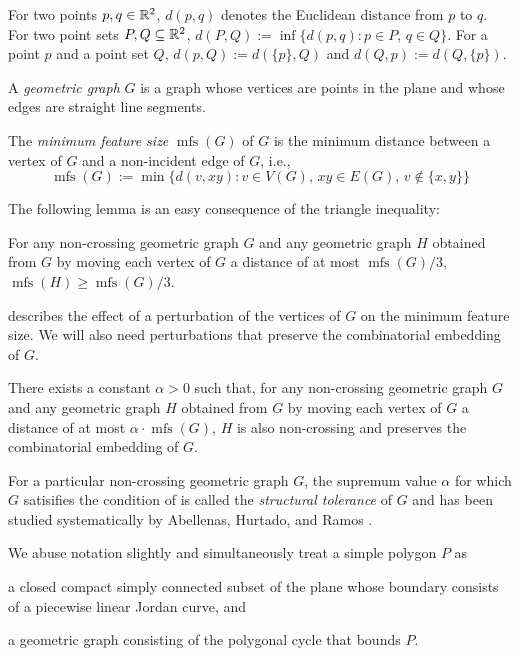 \documentclass{article}
\DeclareMathOperator{\mfs}{mfs}
\begin{document}
For two points $p,q\in\mathbb{R}^2$, $d(p,q)$ denotes the Euclidean distance from $p$ to $q$. For two point sets $P,Q\subseteq\mathbb{R}^2$, $d(P,Q):=\inf\{d(p,q):p\in P,\,q\in Q\}$.  For a point $p$ and a point set $Q$, $d(p,Q):=d(\{p\},Q)$ and $d(Q,p):=d(Q,\{p\})$.

A \emph{geometric graph} $G$ is a graph whose vertices are points in the plane and whose edges are straight line segments.


The \emph{minimum feature size} $\mfs(G)$ of $G$ is the minimum distance between a vertex of $G$ and a non-incident edge of $G$, i.e.,
\[
    \mfs(G):=\min\{d(v,xy): v\in V(G),\, xy\in E(G),\, v\not\in\{x,y\}\}
\]

The following lemma is an easy consequence of the triangle inequality:
\begin{lem}
    For any non-crossing geometric graph $G$ and any geometric graph $H$ obtained from $G$ by moving each vertex of $G$ a distance of at most $\mfs(G)/3$, $\mfs(H)\ge \mfs(G)/3$.
\end{lem}

 describes the effect of a perturbation of the vertices of $G$ on the minimum feature size. We will also need perturbations that preserve the combinatorial embedding of $G$.

\begin{lem}
    There exists a constant $\alpha>0$ such that, for any non-crossing geometric graph $G$ and any geometric graph $H$ obtained from $G$ by moving each vertex of $G$ a distance of at most $\alpha\cdot\mfs(G)$, $H$ is also non-crossing and preserves the combinatorial embedding of $G$.
\end{lem}
For a particular non-crossing geometric graph $G$, the supremum value $\alpha$ for which $G$ satisifies the condition of  is called the \emph{structural tolerance} of $G$ and has been studied systematically by Abellenas, Hurtado, and Ramos \cite{X}.

We abuse notation slightly and simultaneously treat a simple polygon $P$ as
\begin{inparaenum}[(i)]
    \item a closed compact simply connected subset of the plane whose boundary consists of a piecewise linear Jordan curve, and
    \item a geometric graph consisting of the polygonal cycle that bounds $P$.
\end{inparaenum}
\end{document}
